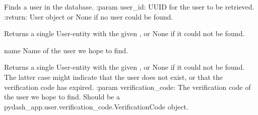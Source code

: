 \documentclass[letterpaper,10pt,english]{sphinxmanual}
\begin{document}

\begin{fulllineitems}
\label{\detokenize{pydash_app.user.repository:pydash_app.user.repository.find}}
Finds a user in the database.
:param user\_id: UUID for the user to be retrieved.
:return: User object or None if no user could be found.

\end{fulllineitems}


\begin{fulllineitems}
\label{\detokenize{pydash_app.user.repository:pydash_app.user.repository.find_by_name}}
Returns a single User-entity with the given , or None if it could not be found.

name \textendash{} Name of the user we hope to find.

\end{fulllineitems}


\begin{fulllineitems}
\label{\detokenize{pydash_app.user.repository:pydash_app.user.repository.find_by_verification_code}}
Returns a single User-entity with the given , or None if it could not be found.
The latter case might indicate that the user does not exist, or that the verification code has expired.
:param verification\_code: The verification code of the user we hope to find.
Should be a pydash\_app.user.verification\_code.VerificationCode object.

\end{fulllineitems}

\end{document}
